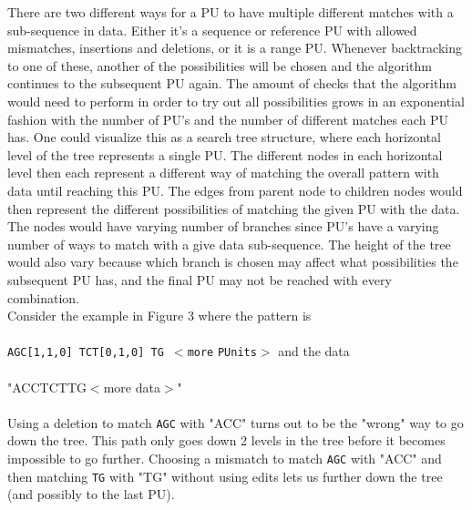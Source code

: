 \documentclass[12pt]{article}
\newcommand{\pu}{PU }
\newcommand{\pus}{PU's }
\newcommand{\pup}{PU. }
\begin{document}
\noindent There are two different ways for a \pu to have multiple different matches with a sub-sequence in data. 
Either it's a sequence or reference \pu with allowed mismatches,
insertions and deletions, or it is a range \pup
Whenever backtracking to one of these, another of the possibilities will be chosen and the algorithm continues to the
subsequent \pu again. The amount of checks that the algorithm would need to perform in order to try out
all possibilities grows in an exponential fashion with the number of \pus and the number of different matches each
\pu has. One could visualize this as a search tree structure, 
where each horizontal level of the tree represents a single \pup The different nodes in each horizontal level
then each represent a different way of matching the overall pattern with data until reaching this \pup 
The edges from parent node to children nodes would then represent the different possibilities of matching the given
\pu with the data.
The nodes would have varying number of branches since \pus have a varying number of ways to match with a give data sub-sequence.
The height of the tree would also vary because which branch is chosen may affect what 
possibilities the subsequent \pu has, and the final \pu may not be reached with every combination. \\
Consider the example in Figure 3 where the pattern is \\ \\
\texttt{AGC[1,1,0]\; TCT[0,1,0]\; TG $<$more} \texttt{PUnits}$>$ and the data \\ \\
"ACCTCTTG$<$more data$>$" \\ \\
Using a deletion to match \texttt{AGC} with "ACC" turns out to be the "wrong" way to go down the tree. This path only
goes down 2 levels in the tree before it becomes impossible to go further. Choosing a mismatch to match \texttt{AGC} with "ACC"
and then matching \texttt{TG} with "TG" without using edits lets us further down the tree (and possibly to the last PU). \\
\end{document}
